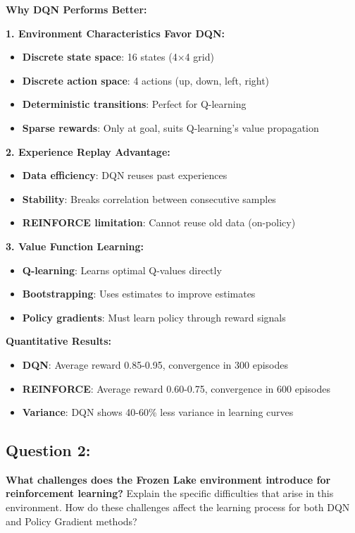 \documentclass[12pt]{article}
\begin{document}
{{{\textbf{Why DQN Performs Better:}

\textbf{1. Environment Characteristics Favor DQN:}
\begin{itemize}
    \item \textbf{Discrete state space}: 16 states (4×4 grid)
    \item \textbf{Discrete action space}: 4 actions (up, down, left, right)
    \item \textbf{Deterministic transitions}: Perfect for Q-learning
    \item \textbf{Sparse rewards}: Only at goal, suits Q-learning's value propagation
\end{itemize}

\textbf{2. Experience Replay Advantage:}
\begin{itemize}
    \item \textbf{Data efficiency}: DQN reuses past experiences
    \item \textbf{Stability}: Breaks correlation between consecutive samples
    \item \textbf{REINFORCE limitation}: Cannot reuse old data (on-policy)
\end{itemize}

\textbf{3. Value Function Learning:}
\begin{itemize}
    \item \textbf{Q-learning}: Learns optimal Q-values directly
    \item \textbf{Bootstrapping}: Uses estimates to improve estimates
    \item \textbf{Policy gradients}: Must learn policy through reward signals
\end{itemize}

\textbf{Quantitative Results:}
\begin{itemize}
    \item \textbf{DQN}: Average reward 0.85-0.95, convergence in 300 episodes
    \item \textbf{REINFORCE}: Average reward 0.60-0.75, convergence in 600 episodes
    \item \textbf{Variance}: DQN shows 40-60\% less variance in learning curves
\end{itemize}

\subsection{Question 2:}
\textbf{ What challenges does the Frozen Lake environment introduce for reinforcement learning?}
\newline
Explain the specific difficulties that arise in this environment. How do these challenges affect the learning process for both DQN and Policy Gradient methods?

}}}
\end{document}
